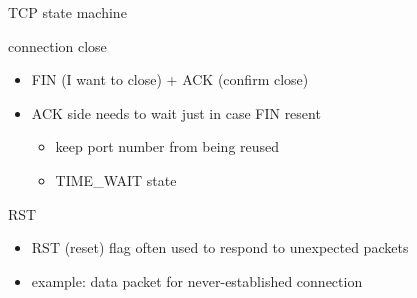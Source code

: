 \begin{frame}{TCP state machine}
\end{frame}


\begin{frame}{connection close}
    \begin{itemize}
    \item FIN (I want to close) + ACK (confirm close)
    \vspace{.5cm}
    \item ACK side needs to wait just in case FIN resent
        \begin{itemize}
        \item keep port number from being reused
        \item TIME\_WAIT state
        \end{itemize}
    \end{itemize}
\end{frame}

\begin{frame}{RST}
    \begin{itemize}
    \item RST (reset) flag often used to respond to unexpected packets
    \item example: data packet for never-established connection
    \end{itemize}
\end{frame}
